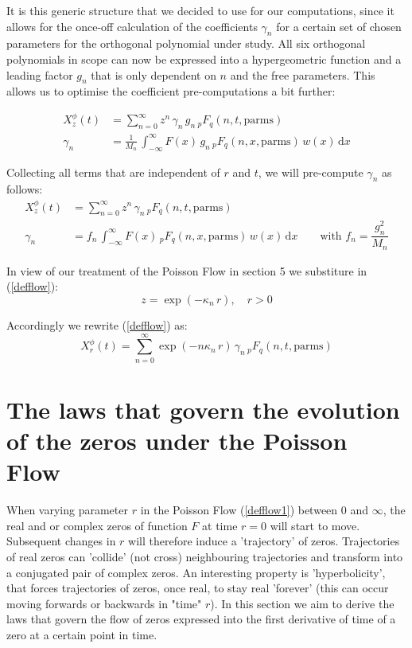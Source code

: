 \documentclass[a4paper,11pt,twoside]{amsart}
\newcommand{\verifiedeq}{=}
\newcommand{\defeq}{=}
\newcommand{\verifiedeq}{\stackrel{\checkmark}{=}}
\newcommand{\defeq}{\stackrel{\scriptscriptstyle \textnormal{def}}{=}}
\begin{document}
It is this generic structure that we decided to use for our computations, since it allows for the once-off calculation of the coefficients $\gamma_n$ for a certain set of chosen parameters for the orthogonal polynomial under study. All six orthogonal polynomials in scope can now be expressed into a hypergeometric function and a leading factor $g_n$ that is only dependent on $n$ and the free parameters. This allows us to optimise the coefficient pre-computations a bit further:

\begin{align}
 X^\phi_z(t) &\verifiedeq \sum_{n=0}^\infty z^n\,\gamma_n\,g_n\,{}_pF_q(n,t,\text{parms})\\
 \gamma_n &\verifiedeq  \frac{1}{M_n}\,\int_{-\infty}^\infty F(x)\, g_n\,{}_pF_q(n,x, \text{parms})\,w(x) \,\mathrm{d}x
\end{align} 

Collecting all terms that are independent of $r$ and $t$, we will pre-compute $\gamma_n$ as follows:
\begin{align}
 X^\phi_z(t) &\verifiedeq \sum_{n=0}^\infty z^n\,\gamma_n\,{}_pF_q(n,t, \text{parms}) \label{defflow} \\
 \gamma_n &\verifiedeq  f_n\,\int_{-\infty}^\infty F(x)\,{}_pF_q(n,x,\text{parms})\,w(x) \,\mathrm{d}x \qquad \text{with } f_n = \dfrac{g_n^2}{M_n} \label{deffn}
\end{align} 

In view of our treatment of the Poisson Flow in section 5 we substiture in (\ref{defflow}):
\begin{equation}
 z \defeq \exp(-\kappa_n\,r), \quad r > 0
\end{equation}

Accordingly we rewrite (\ref{defflow}) as:
\begin{equation}
 X^\phi_r(t) \verifiedeq \sum_{n=0}^\infty \exp(-n\kappa_n\,r)\,\gamma_n\,{}_pF_q(n,t, \text{parms}) \label{defflow1}
\end{equation}

\section{The laws that govern the evolution of the zeros under the Poisson Flow} \label{lawspoissonflow}
When varying parameter $r$ in the Poisson Flow (\ref{defflow1}) between $0$ and $\infty$, the real and or complex zeros of function $F$ at time $r=0$ will start to move. Subsequent changes in $r$ will therefore induce a 'trajectory' of zeros. Trajectories of real zeros can 'collide' (not cross) neighbouring trajectories and transform  into a conjugated pair of complex zeros. An interesting property is 'hyperbolicity', that forces trajectories of zeros, once real, to stay real 'forever' (this can occur moving forwards or backwards in "time" $r$). In this section we aim to derive the laws that govern the flow of zeros expressed into the first derivative of time of a zero at a certain point in time. 
\end{document}
